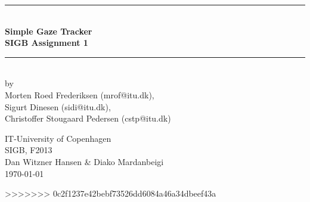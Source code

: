 \documentclass[]{article}
\begin{document}
\begin{titlepage}
\centering \parindent=0pt
\newcommand{\HRule}{\rule{\textwidth}{1mm}}
 \HRule\\[1cm]\Huge\bfseries
Simple Gaze Tracker\\[0.7cm]
\large SIGB Assignment 1\\[1cm]
\HRule\\[4cm]  
\large by 
\\Morten Roed Frederiksen (mrof@itu.dk),  
\\Sigurt Dinesen (sidi@itu.dk),
\\Christoffer Stougaard Pedersen (cstp@itu.dk)\\ 
 \normalsize %
\begin{flushleft}
IT-University of Copenhagen \\
SIGB, F2013\\
Dan Witzner Hansen \& Diako Mardanbeigi \\
\today \end{flushleft}
\end{titlepage}

\tableofcontents








>>>>>>> 0c2f1237e42bebf73526dd6084a46a34dbeef43a
\end{document}
